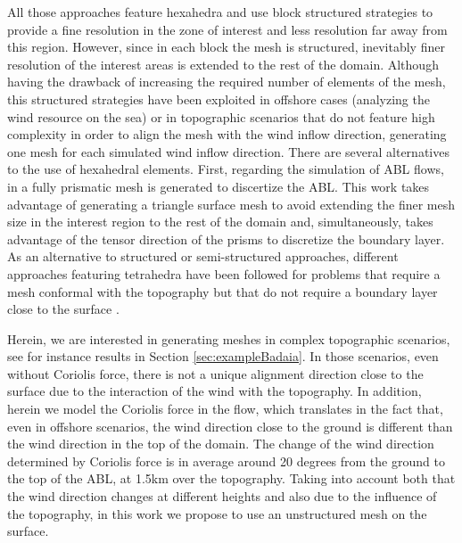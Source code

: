 \documentclass[1p]{elsarticle}
\begin{document}
All those approaches feature hexahedra and use block structured strategies to provide a fine resolution in the zone of interest and less resolution far away from this region. However, since in each block the mesh is structured, inevitably finer resolution of the interest areas is extended to the rest of the domain. Although having the drawback of increasing the required number of elements of the mesh, this structured strategies have been exploited in offshore cases (analyzing the wind resource on the sea) or in topographic scenarios that do not feature high complexity  in order to align the mesh with the wind inflow direction, generating one mesh for each simulated wind inflow direction.
There are several alternatives to the use of hexahedral elements.
First, regarding the simulation of ABL flows, in \cite{zephy} a fully prismatic mesh is generated to discertize the ABL.
This work takes advantage of generating a triangle surface mesh to avoid extending the finer mesh size in the interest region to the rest of the domain and, simultaneously, takes advantage of the tensor direction of the prisms to discretize the boundary layer.
As an alternative to structured or semi-structured approaches, different approaches 
featuring tetrahedra
have been followed for problems that require 
a mesh
conformal with the topography but that do not require a boundary layer
close to the surface \cite{montero19983,montero2005genetic,escobar:smoothingSrfParam,escobar:tetMeshTerrains,behrens:amatos,oliver:windMeccano,gargallo:representingUrbanGeometries}.

Herein, we are interested in generating meshes in complex topographic scenarios, see for instance results in Section \ref{sec:exampleBadaia}. 
In those scenarios, even without Coriolis force, there is not a unique alignment direction close to the surface due to the interaction of the wind with the  topography. 
In addition, herein we model the Coriolis force in the flow, which translates in the fact that, even in  offshore scenarios, the wind direction close to the ground is different than the wind direction in the top of the domain. 
The change of the wind direction determined by Coriolis force is in average around 20 degrees from the ground to the top of the ABL, at 1.5km over the topography.
Taking into account both that the wind direction changes at different heights and also due to the influence of the topography, in this work we propose to use an unstructured mesh on the surface. 
\end{document}
